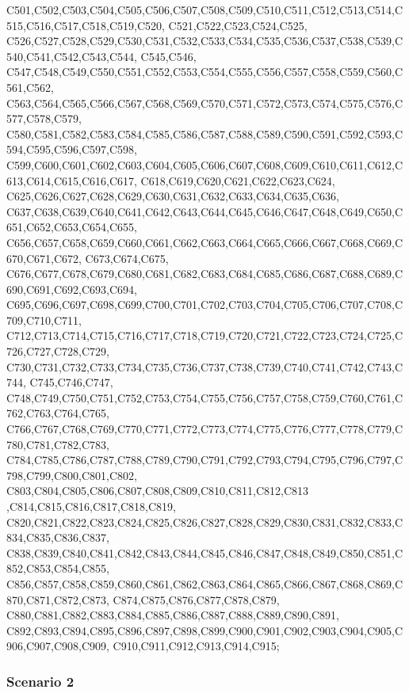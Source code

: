 C501,C502,C503,C504,C505,C506,C507,C508,C509,C510,C511,C512,C513,C514,C515,C516,C517,C518,C519,C520, C521,C522,C523,C524,C525,
C526,C527,C528,C529,C530,C531,C532,C533,C534,C535,C536,C537,C538,C539,C540,C541,C542,C543,C544,
C545,C546, C547,C548,C549,C550,C551,C552,C553,C554,C555,C556,C557,C558,C559,C560,C561,C562, C563,C564,C565,C566,C567,C568,C569,C570,C571,C572,C573,C574,C575,C576,C577,C578,C579,
C580,C581,C582,C583,C584,C585,C586,C587,C588,C589,C590,C591,C592,C593,C594,C595,C596,C597,C598,
C599,C600,C601,C602,C603,C604,C605,C606,C607,C608,C609,C610,C611,C612,C613,C614,C615,C616,C617,
C618,C619,C620,C621,C622,C623,C624, C625,C626,C627,C628,C629,C630,C631,C632,C633,C634,C635,C636,
C637,C638,C639,C640,C641,C642,C643,C644,C645,C646,C647,C648,C649,C650,C651,C652,C653,C654,C655,
C656,C657,C658,C659,C660,C661,C662,C663,C664,C665,C666,C667,C668,C669,C670,C671,C672, C673,C674,C675,
C676,C677,C678,C679,C680,C681,C682,C683,C684,C685,C686,C687,C688,C689,C690,C691,C692,C693,C694,
C695,C696,C697,C698,C699,C700,C701,C702,C703,C704,C705,C706,C707,C708,C709,C710,C711, C712,C713,C714,C715,C716,C717,C718,C719,C720,C721,C722,C723,C724,C725,C726,C727,C728,C729,
C730,C731,C732,C733,C734,C735,C736,C737,C738,C739,C740,C741,C742,C743,C744, C745,C746,C747,
C748,C749,C750,C751,C752,C753,C754,C755,C756,C757,C758,C759,C760,C761,C762,C763,C764,C765, C766,C767,C768,C769,C770,C771,C772,C773,C774,C775,C776,C777,C778,C779,C780,C781,C782,C783, C784,C785,C786,C787,C788,C789,C790,C791,C792,C793,C794,C795,C796,C797,C798,C799,C800,C801,C802,
C803,C804,C805,C806,C807,C808,C809,C810,C811,C812,C813 ,C814,C815,C816,C817,C818,C819,
C820,C821,C822,C823,C824,C825,C826,C827,C828,C829,C830,C831,C832,C833,C834,C835,C836,C837, C838,C839,C840,C841,C842,C843,C844,C845,C846,C847,C848,C849,C850,C851,C852,C853,C854,C855, C856,C857,C858,C859,C860,C861,C862,C863,C864,C865,C866,C867,C868,C869,C870,C871,C872,C873,
C874,C875,C876,C877,C878,C879, C880,C881,C882,C883,C884,C885,C886,C887,C888,C889,C890,C891,
C892,C893,C894,C895,C896,C897,C898,C899,C900,C901,C902,C903,C904,C905,C906,C907,C908,C909,
C910,C911,C912,C913,C914,C915; \\

\subsubsection{Scenario 2}

